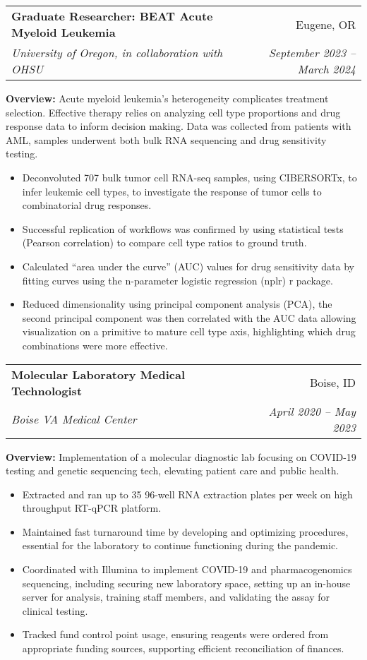 \documentclass[letterpaper,11pt]{article}
\makeatletter
\newcommand{\resumeItem}[1]{
  \item\small{
    {#1 \vspace{-2pt}}
  }
}
\newcommand{\resumeSubheading}[4]{
  \vspace{-1pt}\item
    \begin{tabular*}{0.97\textwidth}[t]{l@{\extracolsep{\fill}}r}
      \textbf{#1} & #2 \\
      \textit{\small#3} & \textit{\small #4} \\
    \end{tabular*}\vspace{-5pt}
}
\newcommand{\resumeItemListStart}{\begin{itemize}}
\newcommand{\resumeItemListEnd}{\end{itemize}\vspace{-5pt}}
\makeatother
\begin{document}
\resumeSubheading
    {Graduate Researcher: BEAT Acute Myeloid Leukemia}{Eugene, OR}
    {University of Oregon, in collaboration with OHSU}{September 2023 -- March 2024}

\smallskip
\textbf{Overview:} 
{Acute myeloid leukemia's heterogeneity complicates treatment selection. Effective therapy relies on analyzing cell type proportions and drug response data to inform decision making. Data was collected from patients with AML, samples underwent both bulk RNA sequencing and drug sensitivity testing.}
    \resumeItemListStart
      \resumeItem{}
        {Deconvoluted 707 bulk tumor cell RNA-seq samples, using CIBERSORTx, to infer leukemic cell types, to investigate the response of tumor cells to combinatorial drug responses.}
      \resumeItem{}
        {Successful replication of workflows was confirmed by using statistical tests (Pearson correlation) to compare cell type ratios to ground truth.}
      \resumeItem{}
        {Calculated “area under the curve” (AUC) values for drug sensitivity data by fitting curves using the n-parameter logistic regression (nplr) r package.}
      \resumeItem{}
        {Reduced dimensionality using principal component analysis (PCA), the second principal component was then correlated with the AUC data allowing visualization on a primitive to mature cell type axis, highlighting which drug combinations were more effective.}
    \resumeItemListEnd

\resumeSubheading
    {Molecular Laboratory Medical Technologist}{Boise, ID}
    {Boise VA Medical Center}{April 2020 -- May 2023}

\smallskip
\textbf{Overview:}
{Implementation of a molecular diagnostic lab focusing on COVID-19 testing and genetic sequencing tech, elevating patient care and public health.}
    \resumeItemListStart
      \resumeItem{}
        {Extracted and ran up to 35 96-well RNA extraction plates per week on high throughput RT-qPCR platform. }
      \resumeItem{}
        {Maintained fast turnaround time by developing and optimizing procedures, essential for the laboratory to continue functioning during the pandemic.}
      \resumeItem{}
        {Coordinated with Illumina to implement COVID-19 and pharmacogenomics sequencing, including securing new laboratory space, setting up an in-house server for analysis, training staff members, and validating the assay for clinical testing.}
      \resumeItem{}
        {Tracked fund control point usage, ensuring reagents were ordered from appropriate funding sources, supporting efficient reconciliation of finances. }
    \resumeItemListEnd
\pagebreak
\end{document}
